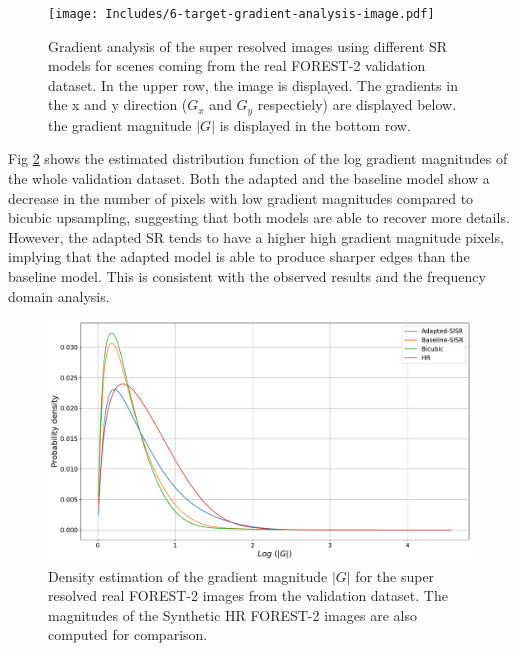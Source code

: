         \begin{figure}[H]
            \centering
            \texttt{[image: Includes/6-target-gradient-analysis-image.pdf]}
            \caption{Gradient analysis of the super resolved images using different SR models for scenes coming from the real FOREST-2 validation dataset.
                     In the upper row, the image is displayed. The gradients in the x and y direction ($G_x$ and $G_y$ respectiely) are displayed below.
                     the gradient magnitude $|G|$ is displayed in the bottom row.}
            \label{fig:6-target-gradient-analysis-image}
        \end{figure}

        Fig \ref{fig:5-gradient-histogram-validation-dataset} shows the estimated distribution function of the log gradient magnitudes of the whole validation dataset.
        Both the adapted and the baseline model show a decrease in the number of pixels with low gradient magnitudes compared to bicubic upsampling, suggesting that both models are able to recover more details.
        However, the adapted SR tends to have a higher high gradient magnitude pixels, implying that the adapted model is able to produce sharper edges than the baseline model.
        This is consistent with the observed results and the frequency domain analysis.

        \begin{figure}[H]
            \centering
            \includegraphics[scale=0.4]{Includes/5-gradient-histogram-validation-dataset.pdf}
            \caption{Density estimation of the gradient magnitude $|G|$ for the super resolved real FOREST-2 images from the validation dataset. The magnitudes of the Synthetic HR FOREST-2 images are also computed for comparison.}
            \label{fig:5-gradient-histogram-validation-dataset}
        \end{figure}


